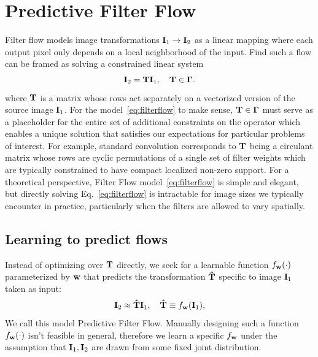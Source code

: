 \documentclass[10pt,twocolumn,letterpaper]{article}
\def\I{{\bf I}}
\def\w{{\bf w}}
\begin{document}
\section{Predictive Filter Flow}
Filter flow models image transformations $\I_1 \rightarrow \I_2$ as a linear
mapping where each output pixel only depends on a local neighborhood of the
input. Find such a flow can be framed as solving a constrained linear system
\begin{equation}
\I_2 = {\bf T} \I_1, \quad {\bf T} \in {\bf\Gamma}.
\label{eq:filterflow}
\end{equation}
where $\bf T$ is a matrix whose rows act separately on a vectorized
version of the source image $\I_1$.
For the model~\ref{eq:filterflow} to make sense,
${\bf T} \in {\bf\Gamma}$ must serve as a placeholder for the entire set of
additional constraints on the operator which enables a unique solution
that satisfies our expectations for particular problems of interest.
For example, standard convolution corresponds to $\bf T$ being a circulant
matrix whose rows are cyclic permutations of a single set of filter weights
which are typically constrained to have compact localized non-zero support.
For a theoretical perspective, Filter Flow model~\ref{eq:filterflow} is simple
and elegant, but directly solving Eq.~\ref{eq:filterflow} is intractable for
image sizes we typically encounter in practice, particularly when the filters
are allowed to vary spatially.

\subsection{Learning to predict flows}
Instead of optimizing over $\bf T$ directly,
we seek for a learnable function $f_{\w}(\cdot)$ parameterized by $\w$
that predicts the transformation $\bf \hat T$ specific to image $\I_1$
taken as input:
\begin{equation}
\I_2 \approx { \bf \hat T} \I_1, \quad {\bf {\hat T}}\equiv f_{\w}(\I_1),
\label{eq:predictivefilterflow1}
\end{equation}
We call this model Predictive Filter Flow.  Manually designing such a function
$f_{\w}(\cdot)$ isn't feasible in general, therefore we learn a specific $f_{\w}$
under the assumption that $\I_1,\I_2$ are drawn from some fixed joint
distribution.
\end{document}
